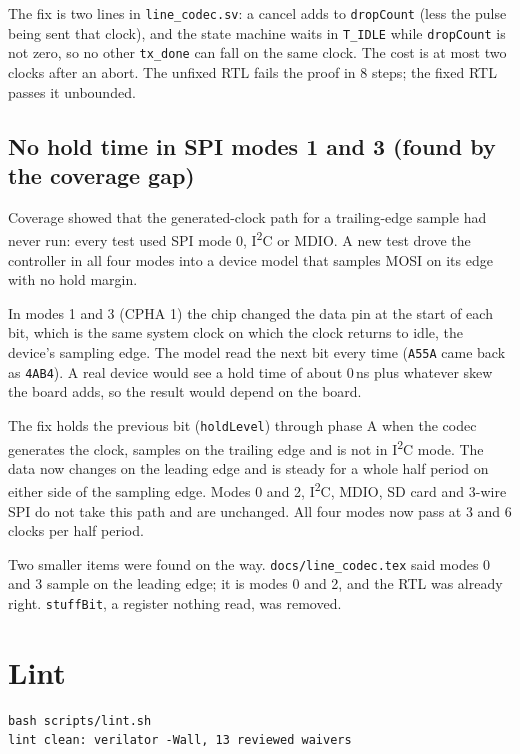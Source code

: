 \documentclass[11pt,a4paper]{article}
\newcommand{\sig}[1]{\texttt{#1}}
\begin{document}
The fix is two lines in \sig{line\_codec.sv}: a cancel adds to \sig{dropCount} (less the pulse being sent that clock), and the state machine waits in \sig{T\_IDLE} while \sig{dropCount} is not zero, so no other \sig{tx\_done} can fall on the same clock. The cost is at most two clocks after an abort. The unfixed RTL fails the proof in 8 steps; the fixed RTL passes it unbounded.

\subsection{No hold time in SPI modes 1 and 3 (found by the coverage gap)}

Coverage showed that the generated-clock path for a trailing-edge sample had never run: every test used SPI mode 0, I\textsuperscript{2}C or MDIO. A new test drove the controller in all four modes into a device model that samples MOSI on its edge with no hold margin.

In modes 1 and 3 (CPHA 1) the chip changed the data pin at the start of each bit, which is the same system clock on which the clock returns to idle, the device's sampling edge. The model read the next bit every time (\texttt{A55A} came back as \texttt{4AB4}). A real device would see a hold time of about 0\,ns plus whatever skew the board adds, so the result would depend on the board.

The fix holds the previous bit (\sig{holdLevel}) through phase A when the codec generates the clock, samples on the trailing edge and is not in I\textsuperscript{2}C mode. The data now changes on the leading edge and is steady for a whole half period on either side of the sampling edge. Modes 0 and 2, I\textsuperscript{2}C, MDIO, SD card and 3-wire SPI do not take this path and are unchanged. All four modes now pass at 3 and 6 clocks per half period.

Two smaller items were found on the way. \sig{docs/line\_codec.tex} said modes 0 and 3 sample on the leading edge; it is modes 0 and 2, and the RTL was already right. \sig{stuffBit}, a register nothing read, was removed.

\section{Lint}

\begin{lstlisting}
bash scripts/lint.sh
lint clean: verilator -Wall, 13 reviewed waivers
\end{lstlisting}
\end{document}
